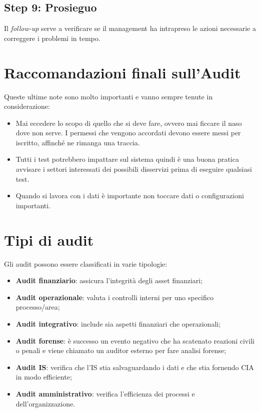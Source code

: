 \subsection{Step 9: Prosieguo}


Il \textit{follow-up} serve a verificare se il management ha intrapreso le azioni
necessarie a correggere i problemi in tempo.

\section{Raccomandazioni finali sull'Audit}

Queste ultime note sono molto importanti e vanno sempre tenute in
considerazione:
\begin{itemize}
\item Mai eccedere lo scopo di quello che si deve fare, ovvero mai ficcare il
naso dove non serve. I permessi che vengono accordati devono essere messi per
iscritto, affinché ne rimanga una traccia.
\item Tutti i test potrebbero impattare sul sistema quindi è una buona
pratica avvisare i settori interessati dei possibili disservizi prima di eseguire
qualsiasi test.
\item Quando si lavora con i dati è importante non toccare dati o configurazioni
importanti.
\end{itemize}


\section{Tipi di audit}

Gli audit possono essere classificati in varie tipologie:
\begin{itemize}
\item \textbf{Audit finanziario}: assicura l'integrità degli asset 
finanziari;
\item \textbf{Audit operazionale}: valuta i controlli interni per uno 
specifico processo/area;
\item \textbf{Audit integrativo}: include sia aspetti finanziari
che operazionali;
\item \textbf{Audit forense}: è successo un evento negativo che ha 
scatenato reazioni civili o penali e viene chiamato un auditor
esterno per fare analisi forense;
\item \textbf{Audit IS}: verifica che l'IS stia salvaguardando i dati
e che stia fornendo CIA in modo efficiente;
\item \textbf{Audit amministrativo}: verifica l'efficienza dei processi
e dell'organizzazione.
\end{itemize}


